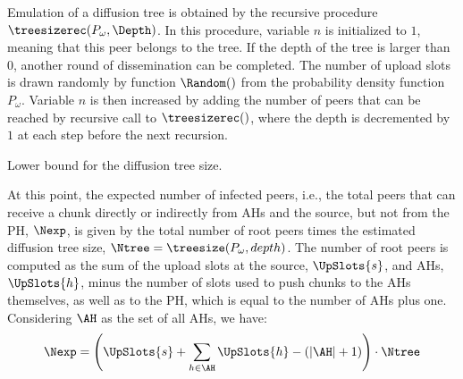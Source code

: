Emulation of a diffusion tree is obtained by the recursive procedure
$\treesizerec(P_{\omega}, \Depth)$. In this procedure, variable $n$ is
initialized to $1$, meaning that this peer belongs to the tree. If the depth
of the tree is larger than $0$, another round of dissemination can be
completed. The number of upload slots is drawn randomly by function
$\Random()$ from the probability density function $P_{\omega}$. Variable $n$
is then increased by adding the number of peers that can be reached by
recursive call to $\treesizerec()$, where the depth is decremented by $1$ at
each step before the next recursion.
\begin{algorithm}[!ht]
\caption{Lower bound for the diffusion tree size.}
\label{src:infected}
\begin{scriptsize}
\BlankLine
{}
\end{scriptsize}
\end{algorithm}

At this point, the expected number of infected peers, i.e., the total peers
that can receive a chunk directly or indirectly from AHs and the source, but
not from the PH, $\Nexp$, is given by the total number of root peers times the
estimated diffusion tree size, $\Ntree = \treesize(P_{\omega}, depth)$. The
number of root peers is computed as the sum of the upload slots at the
source, $\UpSlots{s}$, and AHs, $\UpSlots{h}$, minus the number of slots used to
push chunks to the AHs themselves, as well as to the PH, which is equal to the
number of AHs plus one. Considering $\AH$ as the set of all AHs, we have:
\begin{equation}\label{eq:n}
  \Nexp = \left(\UpSlots{s} + \sum_{h \in \mathit{\AH} } \UpSlots{h} - \left( |\AH| + 1 \right) \right) \cdot \Ntree 
\end{equation}

